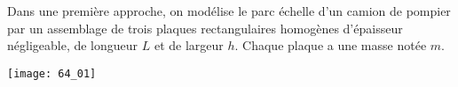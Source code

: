 \normaltrue \difficilefalse \tdifficilefalse
\correctionfalse


\setcounter{question}{0}%
\ifcorrection
\else
{}
\fi



\ifprof
\else
Dans une première approche, on modélise le parc échelle d'un camion de pompier par un assemblage de trois plaques
rectangulaires homogènes d’épaisseur négligeable, de longueur $L$ et de largeur $h$. Chaque plaque a une masse notée $m$.


\begin{marginfigure}
\centering
\texttt{[image: 64\_01]}
\end{marginfigure}
\fi

\ifprof
\else
\fi

\ifprof
\else
{}
\fi